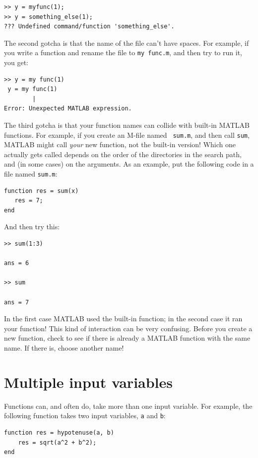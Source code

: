 \documentclass[
]{book}
\begin{document}
\begin{verbatim}
>> y = myfunc(1);
>> y = something_else(1);
??? Undefined command/function 'something_else'.
\end{verbatim}

The second gotcha is that the name of the file can't have spaces.
For example, if you write a function and rename the file to {\tt my func.m},
and then
try to run it, you get:

\begin{verbatim}
>> y = my func(1)
 y = my func(1)
        |
Error: Unexpected MATLAB expression.
\end{verbatim}

The third gotcha is that your function names can collide with built-in
MATLAB functions.  For example, if you create an M-file named {\tt
sum.m}, and then call {\tt sum}, MATLAB might call {\em your} new
function, not the built-in version!  Which one actually gets called
depends on the order of the directories in the search path, and
(in some cases) on the arguments.  As an example, put the following
code in a file named {\tt sum.m}:

\begin{verbatim}
function res = sum(x)
   res = 7;
end
\end{verbatim}

And then try this:

\begin{verbatim}
>> sum(1:3)

ans = 6

>> sum

ans = 7
\end{verbatim}

In the first case MATLAB used the built-in function; in the second
case it ran your function!  This kind of interaction can be very
confusing.  Before you create a new function, check to see if there is
already a MATLAB function with the same name.  If there is, choose
another name!


\section{Multiple input variables}
\label{sect:hypotenuse}

Functions can, and often do, take more than one input variable.
For example, the following function takes two input variables,
{\tt a} and {\tt b}:

\begin{verbatim}
function res = hypotenuse(a, b)
    res = sqrt(a^2 + b^2);
end
\end{verbatim}
\end{document}
